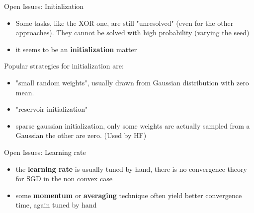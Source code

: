  
\begin{frame}{Open Issues: Initialization}
	
	\begin{itemize}
		\item Some tasks, like the XOR one, are still "unresolved" (even for the other approaches). They cannot be solved with high probability (varying the seed)
		\item it seems to be an \textbf{initialization} matter
	\end{itemize}
	
	Popular strategies for initialization are:
	\begin{itemize}
		\item "small random weights", usually drawn from Gaussian distribution with zero mean. 
		\item "reservoir initialization"
		\item sparse gaussian initialization, only some weights are actually sampled from a Gaussian the other are zero. (Used by HF)
	\end{itemize}
	
\end{frame}

\begin{frame}{Open Issues: Learning rate}
	
	\begin{itemize}	
		\item 	the \textbf{learning rate} is usually tuned by hand, there is no convergence theory for SGD in the non convex case
		\item  some \textbf{momentum} or \textbf{averaging} technique often yield better convergence time, again tuned by hand
	\end{itemize}
	

\end{frame}